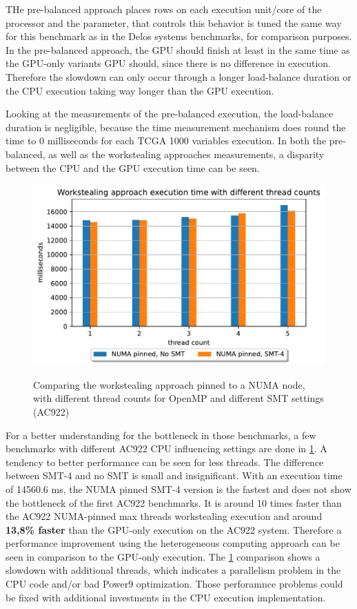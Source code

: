 THe pre-balanced approach places rows on each execution unit/core of the processor and the parameter, that controls this behavior is tuned the same way for this benchmark as in the Delos systems benchmarks, for comparison purposes.
In the pre-balanced approach, the GPU should finish at least in the same time as the GPU-only variants GPU should, since there is no difference in execution. Therefore the slowdown can only occur through a longer load-balance duration or the CPU execution taking way longer than the GPU execution.

Looking at the measurements of the pre-balanced execution, the load-balance duration is negligible, because the time measurement mechanism does round the time to 0 milliseconds for each TCGA 1000 variables execution. In both the pre-balanced, as well as the workstealing approaches measurements, a disparity between the CPU and the GPU execution time can be seen.

\begin{figure}[H]
  \caption{Comparing the workstealing approach pinned to a NUMA node, with different thread counts for OpenMP and different SMT settings (AC922)}
  \includegraphics[width=\textwidth]{figures/ac922_threadcount.pdf}
  \centering
  \label{fig:threadcount_ac922}
\end{figure}

For a better understanding for the bottleneck in those benchmarks, a few benchmarks with different AC922 CPU influencing settings are done in \ref{fig:threadcount_ac922}. A tendency to better performance can be seen for less threads. The difference between SMT-4 and no SMT is small and insignificant. With an execution time of 14560.6 ms, the NUMA pinned SMT-4 version is the fastest and does not show the bottleneck of the first AC922 benchmarks. It is around 10 times faster than the AC922 NUMA-pinned max threads workstealing execution and around \textbf{13,8\% faster} than the GPU-only execution on the AC922 system. Therefore a performance improvement using the heterogeneous computing approach can be seen in comparison to the GPU-only execution. The \ref{fig:threadcount_ac922} comparison shows a slowdown with additional threads, which indicates a parallelism problem in the CPU code and/or bad Power9 optimization. Those perforamnce problems could be fixed with additional investments in the CPU execution implementation.


